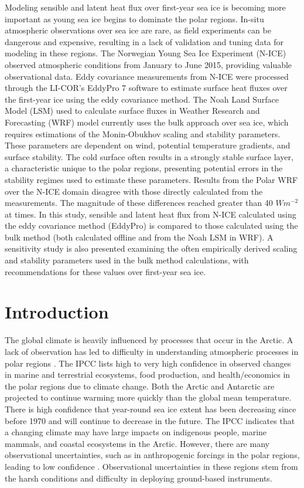 \begin{spacing}{1} \noindent Modeling sensible and latent heat flux over first-year sea ice is becoming more important as young sea ice begins to dominate the polar regions. In-situ atmospheric observations over sea ice are rare, as field experiments can be dangerous and expensive, resulting in a lack of validation and tuning data for modeling in these regions. The Norwegian Young Sea Ice Experiment (N-ICE) observed atmospheric conditions from January to June 2015, providing valuable observational data. Eddy covariance measurements from N-ICE were processed through the LI-COR’s EddyPro 7 software to estimate surface heat fluxes over the first-year ice using the eddy covariance method. The Noah Land Surface Model (LSM) used to calculate surface fluxes in Weather Research and Forecasting (WRF) model currently uses the bulk approach over sea ice, which requires estimations of the Monin-Obukhov scaling and stability parameters. These parameters are dependent on wind, potential temperature gradients, and surface stability. The cold surface often results in a strongly stable surface layer, a characteristic unique to the polar regions, presenting potential errors in the stability regimes used to estimate these parameters. Results from the Polar WRF over the N-ICE domain disagree with those directly calculated from the measurements. The magnitude of these differences reached greater than 40 $Wm^{-2}$ at times. In this study, sensible and latent heat flux from N-ICE calculated using the eddy covariance method (EddyPro) is compared to those calculated using the bulk method (both calculated offline and from the Noah LSM in WRF). A sensitivity study is also presented examining the often empirically derived scaling and stability parameters used in the bulk method calculations, with recommendations for these values over first-year sea ice.
\end{spacing}

\doublespacing
\section{Introduction}

The global climate is heavily influenced by processes that occur in the Arctic. A lack of observation has led to difficulty in understanding atmospheric processes in polar regions \citep{persson:2002}. The IPCC \citep{IPCC:14} lists high to very high confidence in observed changes in marine and terrestrial ecosystems, food production, and health/economics in the polar regions due to climate change. Both the Arctic and Antarctic are projected to continue warming more quickly than the global mean temperature. There is high confidence that year-round sea ice extent has been decreasing since before 1970 and will continue to decrease in the future. The IPCC \citep{IPCC:14} indicates that a changing climate may have large impacts on indigenous people, marine mammals, and coastal ecosystems in the Arctic. However, there are many observational uncertainties, such as in anthropogenic forcings in the polar regions, leading to low confidence \citep{IPCC:14}. Observational uncertainties in these regions stem from the harsh conditions and difficulty in deploying ground-based instruments.

